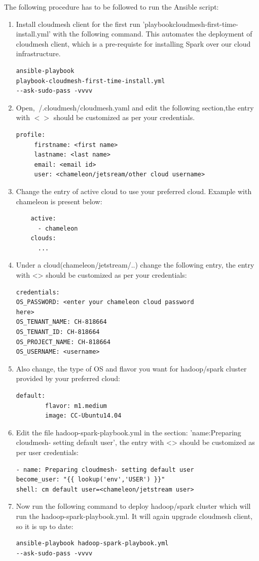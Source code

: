 \documentclass[9pt,twocolumn,twoside]{../../styles/osajnl}
\begin{document}
The following procedure has to be followed to run the Ansible script:
\begin{enumerate}
\item Install cloudmesh client for the first run 'playbookcloudmesh-first-time-install.yml' with the following command. This automates the deployment of cloudmesh client, which is a pre-requiste for installing Spark over our cloud infrastructure.  
\begin{verbatim}
ansible-playbook
playbook-cloudmesh-first-time-install.yml 
--ask-sudo-pass -vvvv
\end{verbatim}
 \item Open, $~$/.cloudmesh/cloudmesh.yaml and edit the following section,the entry with $< >$ should be customized as per your credentials.
\begin{verbatim}
profile:
     firstname: <first name>
     lastname: <last name>
     email: <email id>
     user: <chameleon/jetsream/other cloud username>
\end{verbatim}
\item Change the entry of active cloud to use your preferred cloud.  Example with chameleon is present below:
\begin{verbatim}
    active:
      - chameleon
    clouds:
      ...
\end{verbatim}
\item Under a cloud(chameleon/jetstream/..) change the following entry, the entry with <> should be customized as per your credentials:
\begin{verbatim}
credentials:
OS_PASSWORD: <enter your chameleon cloud password
here>
OS_TENANT_NAME: CH-818664
OS_TENANT_ID: CH-818664
OS_PROJECT_NAME: CH-818664
OS_USERNAME: <username>
\end{verbatim}
\item Also change, the type of OS and flavor you want for hadoop/spark cluster provided by your preferred cloud:
\begin{verbatim}
default:
        flavor: m1.medium
        image: CC-Ubuntu14.04
\end{verbatim}
\item Edit the file hadoop-spark-playbook.yml  in the section:
 'name:Preparing cloudmesh- setting default user', the entry with <> should be customized as per user credentials:
\begin{verbatim}
- name: Preparing cloudmesh- setting default user
become_user: "{{ lookup('env','USER') }}"
shell: cm default user=<chameleon/jetstream user>
\end{verbatim}
\item Now run the following command to deploy hadoop/spark cluster which will run the hadoop-spark-playbook.yml. It will again upgrade cloudmesh client, so it is up to date:
\begin{verbatim}
ansible-playbook hadoop-spark-playbook.yml
--ask-sudo-pass -vvvv
\end{verbatim}
\end{enumerate}
\end{document}
